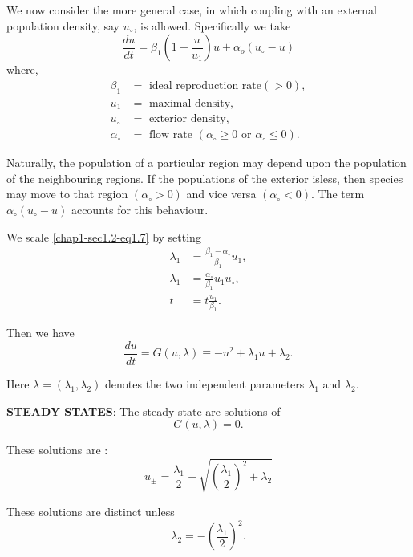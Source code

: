 We now consider the more general case, in which coupling with an
external population density, say $u_\circ$, is allowed. Specifically
we take 
\begin{equation*}
\frac{du}{dt}= \beta_1 (1-\frac{u }{u_1})u + \alpha_o (u_\circ
-u)\tag{1.7}\label{chap1-sec1.2-eq1.7} 
\end{equation*}
where, 
\begin{align*}
\beta_1 			&= \text{ ideal reproduction rate} (>0), \\
u_1   	  			&= \text{ maximal density}, \\
u_\circ   			&= \text{ exterior density}, \\
\alpha_\circ   &= \text{ flow rate } (\alpha_\circ \geq 0 \text{ or }
\alpha_\circ \leq 0). 
\end{align*}

Naturally, the population of a particular region may depend upon the
population of the neighbouring regions. If the populations of the
exterior is\pageoriginale less, then species may move to that region
$(\alpha_\circ > 0)$ and vice versa $(\alpha_\circ < 0)$. The term
$\alpha_\circ(u_\circ- u)$ accounts for this behaviour.  

We scale \eqref{chap1-sec1.2-eq1.7} by setting 
\begin{align*}
\lambda_1 & = \frac{\beta_1- \alpha_\circ }{\beta_1}u_1,\\
\lambda_1 & = \frac{\alpha_\circ }{\beta_1}u_1 u_\circ ,\\
t  &= \bar {t}\frac{u_1} {\beta_1}.
\end{align*}

Then we have 
\begin{equation*}
\frac{du}{d\bar{t}} = G(u,\lambda) \equiv -u^2+\lambda_1 u+\lambda_2.
\tag{1.8}\label{chap1-sec1.2-eq1.8} 
\end{equation*}

Here $\lambda = (\lambda_1, \lambda_2)$ denotes the two independent
parameters $\lambda_1$ and $\lambda_2$.  

\medskip
\noindent
\textbf{STEADY STATES}:  The steady state are solutions of 
$$
G(u, \lambda)=0.
$$

These solutions are :
\begin{equation*}
u_\pm = \frac{\lambda_1}{2}+\sqrt{(\frac{\lambda_1}{2})^2+ \lambda_2}
\tag{1.9}\label{chap1-sec1.2-eq1.9} 
\end{equation*}

These solutions are distinct unless
\begin{equation*}
\lambda_2 = -
(\frac{\lambda_1}{2})^2. \tag{1.10}\label{chap1-sec1.2-eq1.10} 
\end{equation*}

